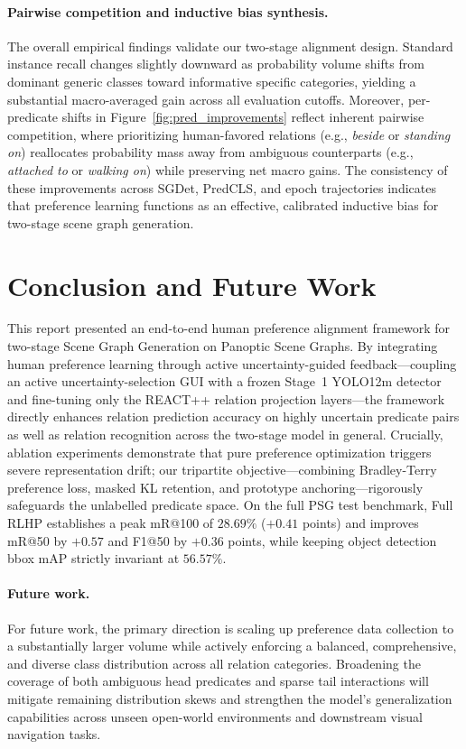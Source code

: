 \documentclass[10pt,twocolumn,letterpaper]{article}
\begin{document}
\paragraph{Pairwise competition and inductive bias synthesis.}
The overall empirical findings validate our two-stage alignment design. Standard instance recall changes slightly downward as probability volume shifts from dominant generic classes toward informative specific categories, yielding a substantial macro-averaged gain across all evaluation cutoffs. Moreover, per-predicate shifts in Figure~\ref{fig:pred_improvements} reflect inherent pairwise competition, where prioritizing human-favored relations (e.g., \textit{beside} or \textit{standing on}) reallocates probability mass away from ambiguous counterparts (e.g., \textit{attached to} or \textit{walking on}) while preserving net macro gains. The consistency of these improvements across SGDet, PredCLS, and epoch trajectories indicates that preference learning functions as an effective, calibrated inductive bias for two-stage scene graph generation.

\section{Conclusion and Future Work}
\label{sec:conclusion}

This report presented an end-to-end human preference alignment framework for two-stage Scene Graph Generation on Panoptic Scene Graphs. By integrating human preference learning through active uncertainty-guided feedback---coupling an active uncertainty-selection GUI with a frozen Stage~1 YOLO12m detector and fine-tuning only the REACT++ relation projection layers---the framework directly enhances relation prediction accuracy on highly uncertain predicate pairs as well as relation recognition across the two-stage model in general. Crucially, ablation experiments demonstrate that pure preference optimization triggers severe representation drift; our tripartite objective---combining Bradley-Terry preference loss, masked KL retention, and prototype anchoring---rigorously safeguards the unlabelled predicate space. On the full PSG test benchmark, Full RLHP establishes a peak mR@100 of $28.69\%$ ($+0.41$ points) and improves mR@50 by $+0.57$ and F1@50 by $+0.36$ points, while keeping object detection bbox mAP strictly invariant at $56.57\%$.

\paragraph{Future work.}
For future work, the primary direction is scaling up preference data collection to a substantially larger volume while actively enforcing a balanced, comprehensive, and diverse class distribution across all relation categories. Broadening the coverage of both ambiguous head predicates and sparse tail interactions will mitigate remaining distribution skews and strengthen the model's generalization capabilities across unseen open-world environments and downstream visual navigation tasks.

\balance
{\small


}
\end{document}
